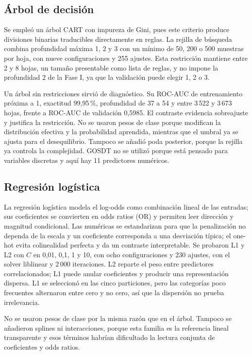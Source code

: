 \subsection{Árbol de decisión}

Se empleó un árbol CART con impureza de Gini, pues este criterio produce divisiones binarias traducibles directamente en reglas. La rejilla de búsqueda combina profundidad máxima 1, 2 y 3 con un mínimo de 50, 200 o 500 muestras por hoja, con nueve configuraciones y 255 ajustes. Esta restricción mantiene entre 2 y 8 hojas, un tamaño presentable como lista de reglas, y no impone la profundidad 2 de la Fase I, ya que la validación puede elegir 1, 2 o 3.

Un árbol sin restricciones sirvió de diagnóstico. Su ROC-AUC de entrenamiento próxima a 1, exactitud 99,95\,\%, profundidad de 37 a 54 y entre 3\,522 y 3\,673 hojas, frente a ROC-AUC de validación 0,5985. El contraste evidencia sobreajuste y justifica la restricción. No se usaron pesos de clase porque modifican la distribución efectiva y la probabilidad aprendida, mientras que el umbral ya se ajusta para el desequilibrio. Tampoco se añadió poda posterior, porque la rejilla ya controla la complejidad. GOSDT no se utilizó porque está pensado para variables discretas y aquí hay 11 predictores numéricos.

\subsection{Regresión logística}

La regresión logística modela el log-odds como combinación lineal de las entradas; sus coeficientes se convierten en odds ratios (OR) y permiten leer dirección y magnitud condicional. Las numéricas se estandarizan para que la penalización no dependa de la escala y un coeficiente corresponda a una desviación típica; el one-hot evita colinealidad perfecta y da un contraste interpretable. Se probaron L1 y L2 con $C$ en 0,01, 0,1, 1 y 10, con ocho configuraciones y 230 ajustes, con el solver liblinear y 2\,000 iteraciones. L2 reparte el peso entre predictores correlacionados; L1 puede anular coeficientes y producir una representación dispersa. L1 se seleccionó en las cinco particiones, pero las categorías poco frecuentes alternaron entre cero y no cero, así que la dispersión no prueba irrelevancia.

No se usaron pesos de clase por la misma razón que en el árbol. Tampoco se añadieron splines ni interacciones, porque esta familia es la referencia lineal transparente y esos términos habrían dificultado la lectura conjunta de coeficientes y odds ratios.

